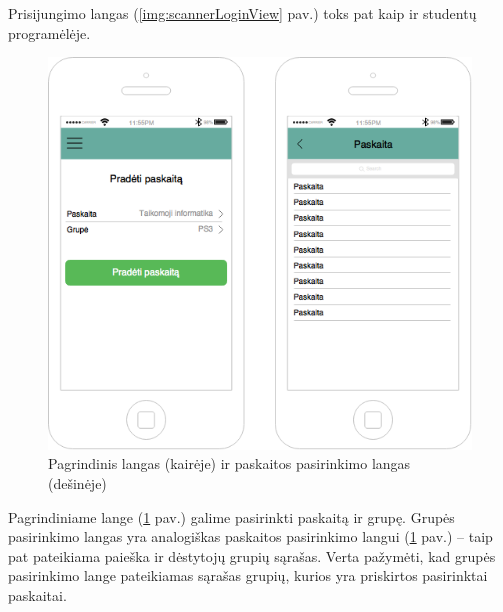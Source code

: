 \documentclass{VUMIFPSbakalaurinis}
\begin{document}
Prisijungimo langas (\ref{img:scannerLoginView} pav.) toks pat kaip ir studentų programėlėje.

\begin{figure}[H]
	\centering
	\includegraphics[scale=0.5]{img/kursinio_app_dest_main}
	\caption{Pagrindinis langas (kairėje) ir paskaitos pasirinkimo langas (dešinėje)}
	\label{img:scannerMainView}
\end{figure}

Pagrindiniame lange (\ref{img:scannerMainView} pav.) galime pasirinkti paskaitą ir grupę. Grupės pasirinkimo langas yra analogiškas paskaitos pasirinkimo langui (\ref{img:scannerMainView} pav.) – taip pat pateikiama paieška ir dėstytojų grupių sąrašas. Verta pažymėti, kad grupės pasirinkimo lange pateikiamas sąrašas grupių, kurios yra priskirtos pasirinktai paskaitai.
\end{document}
